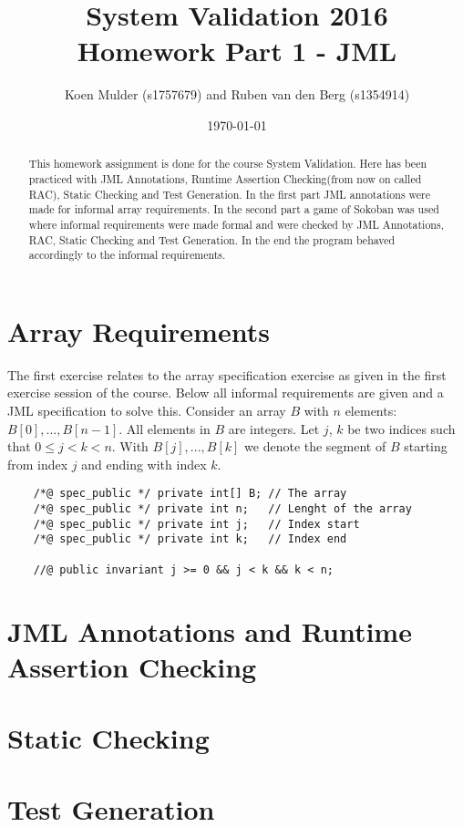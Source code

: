 \documentclass[a4paper]{article}
\title{System Validation 2016 \\ Homework Part 1 - JML}
\author{Koen Mulder (s1757679) and Ruben van den Berg (s1354914)}
\date{\today}
\begin{document}
\maketitle

\begin{abstract}
This homework assignment is done for the course System Validation. Here has been practiced with JML Annotations, Runtime Assertion Checking(from now on called RAC), Static Checking and Test Generation. In the first part JML annotations were made for informal array requirements. In the second part a game of Sokoban was used where informal requirements were made formal and were checked by JML Annotations, RAC, Static Checking and Test Generation. In the end the program behaved accordingly to the informal requirements. 
\end{abstract}

\section{Array Requirements}
The first exercise relates to the array specification exercise as given in the first exercise session of the course. Below all informal requirements are given and a JML specification to solve this.
Consider an array $B$ with $n$ elements: $B[0], . . . , B[n-1]$.
All elements in $B$ are integers. Let $j$, $k$ be two indices such that $0 \leq j < k < n$.
With $B[j], . . . , B[k]$ we denote the segment of $B$ starting from index $j$ and ending with index $k$.
\begin{lstlisting}
	/*@ spec_public */ private int[] B;	// The array
	/*@ spec_public */ private int n;	// Lenght of the array
	/*@ spec_public */ private int j;	// Index start
	/*@ spec_public */ private int k;	// Index end
	
	//@ public invariant j >= 0 && j < k && k < n;
\end{lstlisting}
\section{JML Annotations and Runtime Assertion Checking}


\section{Static Checking}


\section{Test Generation}
\end{document}
